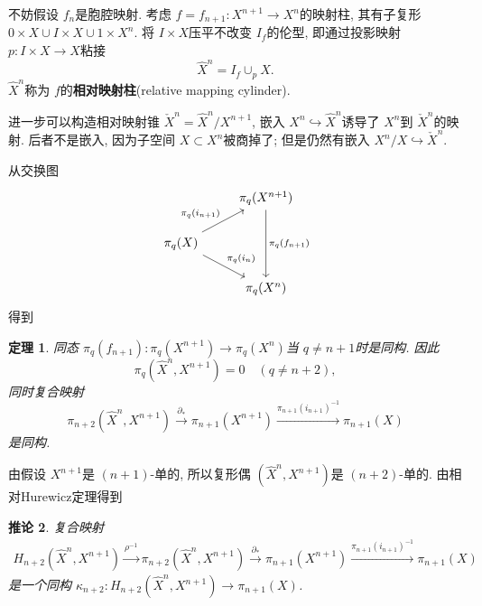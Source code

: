 \documentclass{ctexart}
\theoremstyle{plain}
\newtheorem{theorem}{定理}[section]
\newtheorem{corollary}[theorem]{推论}
\theoremstyle{definition}
\renewcommand{\emph}{\textbf}
\begin{document}
        不妨假设 $f_{n}$是胞腔映射. 考虑 $f=f_{n+1}:X^{n+1}\to X^{n}$的映射柱, 其有子复形 $0\times X \cup I\times X \cup 1\times X^{n}$. 将 $I\times X$压平不改变 $I_{f}$的伦型, 即通过投影映射 $p:I\times X\to X$粘接 
        \begin{equation*}
          \hat{X}^{n}=I_{f}\cup _{p}X.
        \end{equation*}
        $\hat{X}^{n}$称为 $f$的\emph{相对映射柱}(relative mapping cylinder).

        进一步可以构造相对映射锥 $\check{X}^n=\hat{X}^n / X^{n+1}$, 嵌入 $X^{n}\hookrightarrow \hat{X}^{n}$诱导了 $X^{n}$到 $\check{X}^{n}$的映射. 后者不是嵌入, 因为子空间 $X \subset X^{n}$被商掉了; 但是仍然有嵌入 $X^{n}/X\hookrightarrow \check{X}^{n}$.

        从交换图 
        \begin{equation*}
            \begin{tikzcd}
                & \pi_{q}(X^{n+1}) \arrow[dd, "\pi_{q}(f_{n+1})"] \\
                \pi_{q}(X) \arrow[ur, "\pi_{q}(i_{n+1})"] \arrow[dr, "\pi_{q}(i_{n})"] \\
                & \pi_{q}(X^{n})
            \end{tikzcd}
        \end{equation*}
        得到

        \begin{theorem}
            同态 $\pi_{q}(f_{n+1}):\pi_{q}(X^{n+1})\to \pi_{q}(X^{n})$当 $q\neq n+1$时是同构. 因此 
            \begin{equation*}
              \pi_{q}(\hat{X}^{n},X^{n+1})=0\quad (q\neq n+2),
            \end{equation*}
            同时复合映射
            \begin{equation*}
                \pi_{n+2}\left(\hat{X}^n, X^{n+1}\right) \xrightarrow{\partial_*} \pi_{n+1}\left(X^{n+1}\right) \xrightarrow{\pi_{n+1}\left(i_{n+1}\right)^{-1}} \pi_{n+1}(X)
            \end{equation*}
            是同构.
        \end{theorem}

        由假设 $X^{n+1}$是 $(n+1)$-单的, 所以复形偶 $(\hat{X}^{n},X^{n+1})$是 $(n+2)$-单的. 由相对Hurewicz定理得到
        \begin{corollary}
            复合映射
            \begin{equation*}
                \begin{aligned}
                    H_{n+2}\left(\hat{X}^n, X^{n+1}\right) \xrightarrow{\rho^{-1}} \pi_{n+2}\left(\hat{X}^n, X^{n+1}\right) \xrightarrow{\partial_*} 
                    \pi_{n+1}\left(X^{n+1}\right) \xrightarrow{\pi_{n+1}\left(i_{n+1}\right)^{-1}} \pi_{n+1}(X)
                \end{aligned}
            \end{equation*}
            是一个同构 $\kappa_{n+2}:H_{n+2}(\hat{X}^{n},X^{n+1})\to \pi_{n+1}(X)$.
        \end{corollary}
\end{document}
